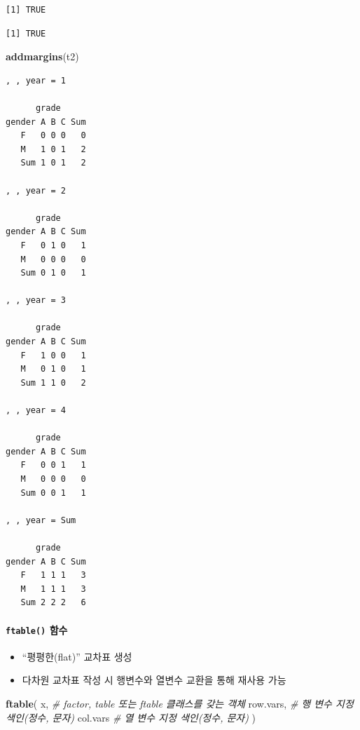 \documentclass[
  11pt,
]{krantz}
\newenvironment{Shaded}{\begin{snugshade}}{\end{snugshade}}
\newcommand{\CommentTok}[1]{\textcolor[rgb]{0.37,0.37,0.37}{\textit{#1}}}
\newcommand{\KeywordTok}[1]{\textcolor[rgb]{0.27,0.27,0.27}{\textbf{#1}}}
\newcommand{\NormalTok}[1]{#1}
\providecommand{\tightlist}{%
  \setlength{\itemsep}{0pt}\setlength{\parskip}{0pt}}
\begin{document}
\begin{verbatim}
[1] TRUE
\end{verbatim}

\begin{verbatim}
[1] TRUE
\end{verbatim}

\begin{Shaded}
\begin{Highlighting}[]
\KeywordTok{addmargins}\NormalTok{(t2)}
\end{Highlighting}
\end{Shaded}

\begin{verbatim}
, , year = 1

      grade
gender A B C Sum
   F   0 0 0   0
   M   1 0 1   2
   Sum 1 0 1   2

, , year = 2

      grade
gender A B C Sum
   F   0 1 0   1
   M   0 0 0   0
   Sum 0 1 0   1

, , year = 3

      grade
gender A B C Sum
   F   1 0 0   1
   M   0 1 0   1
   Sum 1 1 0   2

, , year = 4

      grade
gender A B C Sum
   F   0 0 1   1
   M   0 0 0   0
   Sum 0 0 1   1

, , year = Sum

      grade
gender A B C Sum
   F   1 1 1   3
   M   1 1 1   3
   Sum 2 2 2   6
\end{verbatim}

\normalsize

\hypertarget{tab-fun3}{%
\paragraph{\texorpdfstring{\texttt{ftable()} 함수}{ftable() 함수}}\label{tab-fun3}}

\begin{itemize}
\tightlist
\item
  ``평평한(flat)'' 교차표 생성
\item
  다차원 교차표 작성 시 행변수와 열변수 교환을 통해 재사용 가능
\end{itemize}

\footnotesize

\begin{Shaded}
\begin{Highlighting}[]
\KeywordTok{ftable}\NormalTok{(}
\NormalTok{  x,  }\CommentTok{# factor, table 또는 ftable 클래스를 갖는 객체}
\NormalTok{  row.vars, }\CommentTok{# 행 변수 지정 색인(정수, 문자)}
\NormalTok{  col.vars  }\CommentTok{# 열 변수 지정 색인(정수, 문자)}
\NormalTok{)}
\end{Highlighting}
\end{Shaded}
\end{document}
